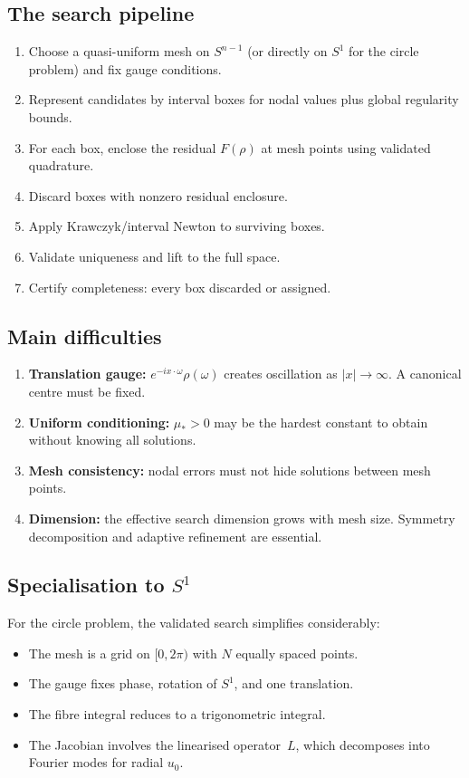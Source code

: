 \documentclass[12pt]{article}
\theoremstyle{definition}
\theoremstyle{remark}
\begin{document}
\subsection{The search pipeline}

\begin{enumerate}[leftmargin=2em]
  \item Choose a quasi-uniform mesh on $S^{n-1}$ (or directly on $S^1$
    for the circle problem) and fix gauge conditions.
  \item Represent candidates by interval boxes for nodal values plus global
    regularity bounds.
  \item For each box, enclose the residual $F(\rho)$ at mesh points using
    validated quadrature.
  \item Discard boxes with nonzero residual enclosure.
  \item Apply Krawczyk/interval Newton to surviving boxes.
  \item Validate uniqueness and lift to the full space.
  \item Certify completeness: every box discarded or assigned.
\end{enumerate}

\subsection{Main difficulties}

\begin{enumerate}[leftmargin=2em]
  \item \textbf{Translation gauge:} $e^{-ix\cdot\omega}\rho(\omega)$ creates
    oscillation as $|x|\to\infty$.  A canonical centre must be fixed.
  \item \textbf{Uniform conditioning:} $\mu_*>0$ may be the hardest
    constant to obtain without knowing all solutions.
  \item \textbf{Mesh consistency:} nodal errors must not hide solutions
    between mesh points.
  \item \textbf{Dimension:} the effective search dimension grows with
    mesh size.  Symmetry decomposition and adaptive refinement are essential.
\end{enumerate}

\subsection{Specialisation to $S^1$}

For the circle problem, the validated search simplifies considerably:
\begin{itemize}
  \item The mesh is a grid on $[0,2\pi)$ with $N$ equally spaced points.
  \item The gauge fixes phase, rotation of $S^1$, and one translation.
  \item The fibre integral reduces to a trigonometric integral.
  \item The Jacobian involves the linearised operator~$L$, which decomposes
    into Fourier modes for radial $u_0$.
\end{itemize}
\end{document}
